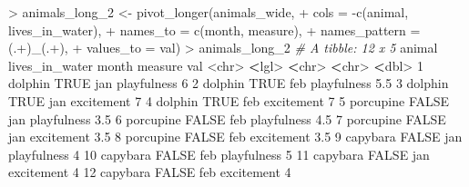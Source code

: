 \documentclass[
]{book}
\newenvironment{Shaded}{\begin{snugshade}}{\end{snugshade}}
\newcommand{\AttributeTok}[1]{\textcolor[rgb]{0.77,0.63,0.00}{#1}}
\newcommand{\CommentTok}[1]{\textcolor[rgb]{0.56,0.35,0.01}{\textit{#1}}}
\newcommand{\ConstantTok}[1]{\textcolor[rgb]{0.00,0.00,0.00}{#1}}
\newcommand{\DecValTok}[1]{\textcolor[rgb]{0.00,0.00,0.81}{#1}}
\newcommand{\ErrorTok}[1]{\textcolor[rgb]{0.64,0.00,0.00}{\textbf{#1}}}
\newcommand{\FloatTok}[1]{\textcolor[rgb]{0.00,0.00,0.81}{#1}}
\newcommand{\FunctionTok}[1]{\textcolor[rgb]{0.00,0.00,0.00}{#1}}
\newcommand{\NormalTok}[1]{#1}
\newcommand{\OtherTok}[1]{\textcolor[rgb]{0.56,0.35,0.01}{#1}}
\newcommand{\SpecialCharTok}[1]{\textcolor[rgb]{0.00,0.00,0.00}{#1}}
\newcommand{\StringTok}[1]{\textcolor[rgb]{0.31,0.60,0.02}{#1}}
\begin{document}
\begin{Shaded}
\begin{Highlighting}[]
\SpecialCharTok{\textgreater{}}\NormalTok{ animals\_long\_2 }\OtherTok{\textless{}{-}} \FunctionTok{pivot\_longer}\NormalTok{(animals\_wide,}
\SpecialCharTok{+}                                \AttributeTok{cols =} \SpecialCharTok{{-}}\FunctionTok{c}\NormalTok{(}\StringTok{\textquotesingle{}animal\textquotesingle{}}\NormalTok{, }\StringTok{\textquotesingle{}lives\_in\_water\textquotesingle{}}\NormalTok{),}
\SpecialCharTok{+}                                \AttributeTok{names\_to =} \FunctionTok{c}\NormalTok{(}\StringTok{\textquotesingle{}month\textquotesingle{}}\NormalTok{, }\StringTok{\textquotesingle{}measure\textquotesingle{}}\NormalTok{),}
\SpecialCharTok{+}                                \AttributeTok{names\_pattern =} \StringTok{\textquotesingle{}(.+)\_(.+)\textquotesingle{}}\NormalTok{,}
\SpecialCharTok{+}                                \AttributeTok{values\_to =} \StringTok{\textquotesingle{}val\textquotesingle{}}\NormalTok{)}
\SpecialCharTok{\textgreater{}}\NormalTok{ animals\_long\_2}
\CommentTok{\# A tibble: 12 x 5}
\NormalTok{   animal    lives\_in\_water month measure       val}
   \SpecialCharTok{\textless{}}\NormalTok{chr}\SpecialCharTok{\textgreater{}}     \ErrorTok{\textless{}}\NormalTok{lgl}\SpecialCharTok{\textgreater{}}          \ErrorTok{\textless{}}\NormalTok{chr}\SpecialCharTok{\textgreater{}} \ErrorTok{\textless{}}\NormalTok{chr}\SpecialCharTok{\textgreater{}}       \ErrorTok{\textless{}}\NormalTok{dbl}\SpecialCharTok{\textgreater{}}
 \DecValTok{1}\NormalTok{ dolphin   }\ConstantTok{TRUE}\NormalTok{           jan   playfulness   }\DecValTok{6}  
 \DecValTok{2}\NormalTok{ dolphin   }\ConstantTok{TRUE}\NormalTok{           feb   playfulness   }\FloatTok{5.5}
 \DecValTok{3}\NormalTok{ dolphin   }\ConstantTok{TRUE}\NormalTok{           jan   excitement    }\DecValTok{7}  
 \DecValTok{4}\NormalTok{ dolphin   }\ConstantTok{TRUE}\NormalTok{           feb   excitement    }\DecValTok{7}  
 \DecValTok{5}\NormalTok{ porcupine }\ConstantTok{FALSE}\NormalTok{          jan   playfulness   }\FloatTok{3.5}
 \DecValTok{6}\NormalTok{ porcupine }\ConstantTok{FALSE}\NormalTok{          feb   playfulness   }\FloatTok{4.5}
 \DecValTok{7}\NormalTok{ porcupine }\ConstantTok{FALSE}\NormalTok{          jan   excitement    }\FloatTok{3.5}
 \DecValTok{8}\NormalTok{ porcupine }\ConstantTok{FALSE}\NormalTok{          feb   excitement    }\FloatTok{3.5}
 \DecValTok{9}\NormalTok{ capybara  }\ConstantTok{FALSE}\NormalTok{          jan   playfulness   }\DecValTok{4}  
\DecValTok{10}\NormalTok{ capybara  }\ConstantTok{FALSE}\NormalTok{          feb   playfulness   }\DecValTok{5}  
\DecValTok{11}\NormalTok{ capybara  }\ConstantTok{FALSE}\NormalTok{          jan   excitement    }\DecValTok{4}  
\DecValTok{12}\NormalTok{ capybara  }\ConstantTok{FALSE}\NormalTok{          feb   excitement    }\DecValTok{4}  
\end{Highlighting}
\end{Shaded}
\end{document}
